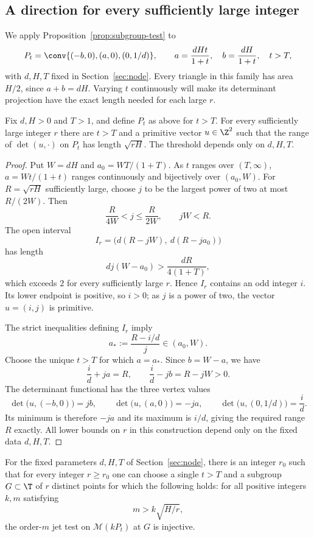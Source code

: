 \subsection{A direction for every sufficiently large integer}

We apply Proposition~\ref{prop:subgroup-test} to
\[
 P_t=\conv\{(-b,0),(a,0),(0,1/d)\},
 \qquad
 a=\frac{dHt}{1+t},\quad b=\frac{dH}{1+t},\quad t>T,
\]
with $d,H,T$ fixed in Section~\ref{sec:node}.  Every triangle in this
family has area $H/2$, since $a+b=dH$.  Varying $t$ continuously will
make its determinant projection have the exact length needed for each
large $r$.

\begin{lemma}\label{lem:direction}
Fix $d,H>0$ and $T>1$, and define $P_t$ as above for $t>T$.
For every sufficiently large integer $r$ there are $t>T$ and a primitive
vector $u\in\Z^2$ such that the range of $\det(u,\cdot)$ on $P_t$ has
length $\sqrt{rH}$.  The threshold depends only on $d,H,T$.
\end{lemma}

\begin{proof}
Put $W=dH$ and $a_0=WT/(1+T)$.  As $t$ ranges over $(T,\infty)$,
$a=Wt/(1+t)$ ranges continuously and bijectively over $(a_0,W)$.
For $R=\sqrt{rH}$ sufficiently large, choose $j$ to be the largest power
of two at most $R/(2W)$.  Then
\[
 \frac{R}{4W}<j\leq\frac{R}{2W},
 \qquad jW<R.
\]
The open interval
\[
 I_r=\bigl(d(R-jW),\ d(R-ja_0)\bigr)
\]
has length
\[
 dj(W-a_0)>\frac{dR}{4(1+T)},
\]
which exceeds $2$ for every sufficiently large $r$.  Hence $I_r$
contains an odd integer $i$.  Its lower endpoint is positive, so $i>0$;
as $j$ is a power of two, the vector $u=(i,j)$ is primitive.

The strict inequalities defining $I_r$ imply
\[
 a_*:=\frac{R-i/d}{j}\in(a_0,W).
\]
Choose the unique $t>T$ for which $a=a_*$.  Since $b=W-a$, we have
\[
 \frac{i}{d}+ja=R,
 \qquad
 \frac{i}{d}-jb=R-jW>0.
\]
The determinant functional has the three vertex values
\[
 \det\bigl(u,(-b,0)\bigr)=jb,
 \qquad
 \det\bigl(u,(a,0)\bigr)=-ja,
 \qquad
 \det\bigl(u,(0,1/d)\bigr)=\frac{i}{d}.
\]
Its minimum is therefore $-ja$ and its maximum is $i/d$, giving the
required range $R$ exactly.  All lower bounds on $r$ in this construction
depend only on the fixed data $d,H,T$.
\end{proof}

\begin{corollary}\label{cor:torus-test}
For the fixed parameters $d,H,T$ of Section~\ref{sec:node}, there is an
integer $r_0$ such that for every integer $r\geq r_0$ one can choose a
single $t>T$ and a subgroup $G\subset\T$ of $r$ distinct points for
which the following holds: for all positive integers $k,m$ satisfying
\[
 m>k\sqrt{H/r},
\]
the order-$m$ jet test on $\mathcal M(kP_t)$ at $G$ is injective.
\end{corollary}

